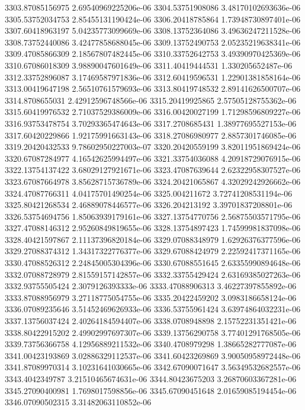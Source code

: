 {3303.87085156975 2.69540969225206e-06
3304.53751908086 3.48170102693636e-06
3305.53752034753 2.85455131190424e-06
3306.20418785864 1.73948730897401e-06
3307.60418963197 5.04235773099669e-06
3308.13752364086 3.49636247211528e-06
3308.73752440086 3.42477858688045e-06
3309.13752490753 2.05235219638341e-06
3309.47085866309 2.18567807482445e-06
3310.33752642753 3.49390970425369e-06
3310.67086018309 3.98890047601649e-06
3311.40419444531 1.330205652487e-06
3312.33752896087 3.17469587971836e-06
3312.60419596531 1.22901381858164e-06
3313.00419647198 2.56510761579693e-06
3313.80419748532 2.89141626500707e-06
3314.8708655031 2.42912596748566e-06
3315.20419925865 2.57505128755362e-06
3315.60419976532 2.71037529386009e-06
3316.00420027199 1.71298596809227e-06
3316.93753478754 3.70293365474643e-06
3317.2708685431 1.38977695527153e-06
3317.60420229866 1.92175991663143e-06
3318.27086980977 2.8857301746085e-06
3319.20420432533 9.78602950227003e-07
3320.20420559199 3.82011951869424e-06
3320.67087284977 4.16542625994497e-06
3321.33754036088 4.20918729076915e-06
3322.13754137422 3.68029127921671e-06
3323.47087639644 2.62322958307527e-06
3323.67087664978 3.85628715736789e-06
3324.20421065867 4.32029242926662e-06
3324.47087766311 4.04175701490254e-06
3325.004211672 3.72741208531194e-06
3325.80421268534 2.46889078446577e-06
3326.204213192 3.39701837208801e-06
3326.53754694756 1.85063939179161e-06
3327.13754770756 2.56875503571795e-06
3327.47088146312 2.95260849819655e-06
3328.13754897423 1.74599981837098e-06
3328.40421597867 2.11137396820184e-06
3329.07088348979 1.62926376377596e-06
3329.27088374312 1.34317322776377e-06
3329.67088424979 2.22592417371165e-06
3330.47088526312 2.24845005304396e-06
3330.67088551645 2.63355990894648e-06
3332.07088728979 2.81559157142857e-06
3332.33755429424 2.63169385027263e-06
3332.93755505424 2.3079126393333e-06
3333.47088906313 3.46227397855892e-06
3333.87088956979 3.27118775054755e-06
3335.20422459202 3.0983186658124e-06
3336.07089235646 3.51452469626933e-06
3336.53755961424 3.63974864032231e-06
3337.13756037424 2.40264184594407e-06
3338.0708948898 2.15752231351421e-06
3338.80422915202 2.49902997697307e-06
3339.13756290758 3.77401291768505e-06
3339.73756366758 4.12956889211532e-06
3340.4708979298 1.38665282777087e-06
3341.00423193869 3.02886329112537e-06
3341.60423269869 3.90050958972448e-06
3341.87089970314 3.10231641030665e-06
3342.67090071647 3.56349532682557e-06
3343.4042349787 3.21510465674631e-06
3344.80423675203 3.26870603367281e-06
3345.27090400981 1.7698017598856e-06
3345.67090451648 2.01659085194454e-06
3346.07090502315 3.31482063110852e-06
}
